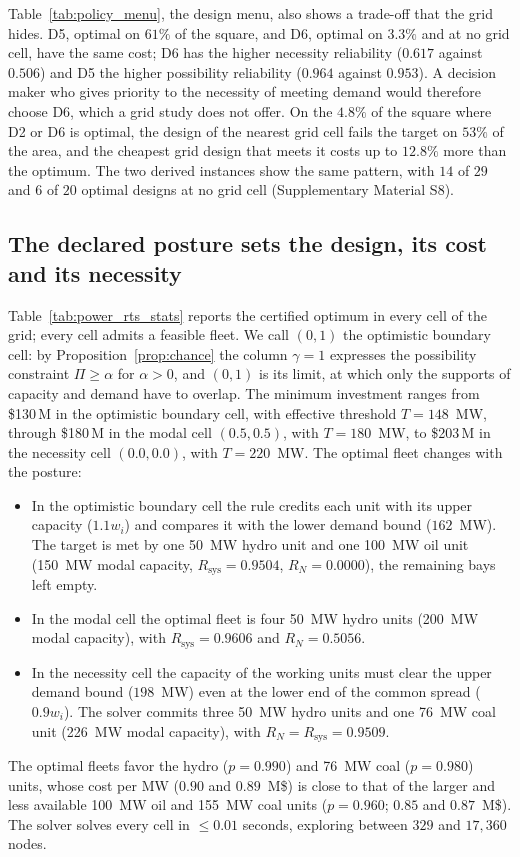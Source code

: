 \documentclass[Review,sagev,times]{sagej}%
\newcommand{\Rsys}{R_{\mathrm{sys}}}\newcommand{\Rtarget}{R_{\mathrm{target}}}
\begin{document}
Table~\ref{tab:policy_menu}, the design menu, also shows a trade-off that the grid hides. D5, optimal on $61\%$
of the square, and D6, optimal on $3.3\%$ and at no grid cell, have the same cost; D6 has the higher necessity
reliability ($0.617$ against $0.506$) and D5 the higher possibility reliability ($0.964$ against $0.953$). A
decision maker who gives priority to the necessity of meeting demand would therefore choose D6, which a grid
study does not offer. On the $4.8\%$ of the square where D2 or D6 is optimal, the design of the nearest grid cell
fails the target on $53\%$ of the area, and the cheapest grid design that meets it costs up to $12.8\%$ more than
the optimum. The two derived instances show the same pattern, with $14$ of $29$ and $6$ of $20$ optimal designs
at no grid cell (Supplementary Material S8).

\subsection{The declared posture sets the design, its cost and its necessity} \label{sec:posture}



Table~\ref{tab:power_rts_stats} reports the certified optimum in every cell of the grid; every cell admits a
feasible fleet. We call $(0,1)$ the optimistic boundary cell: by Proposition~\ref{prop:chance} the column
$\gamma=1$ expresses the possibility constraint $\Pi \ge \alpha$ for $\alpha > 0$, and $(0,1)$ is its limit, at
which only the supports of capacity and demand have to overlap. The minimum investment ranges from \$130\,M in
the optimistic boundary cell, with effective threshold $T = 148$~MW, through \$180\,M in the modal cell
$(0.5, 0.5)$, with $T = 180$~MW, to \$203\,M in the necessity cell $(0.0, 0.0)$, with $T = 220$~MW. The optimal
fleet changes with the posture:
\begin{itemize}
\item In the optimistic boundary cell the rule credits each unit with its upper capacity ($1.1 w_i$) and compares
it with the lower demand bound ($162$~MW). The target is met by one 50~MW hydro unit and one 100~MW oil unit
(150~MW modal capacity, $\Rsys = 0.9504$, $R_N = 0.0000$), the remaining bays left empty.
\item In the modal cell the optimal fleet is four 50~MW hydro units (200~MW modal capacity), with $\Rsys = 0.9606$
and $R_N = 0.5056$.
\item In the necessity cell the capacity of the working units must clear the upper demand bound ($198$~MW) even at
the lower end of the common spread ($0.9 w_i$). The solver commits three 50~MW hydro units and one 76~MW coal
unit (226~MW modal capacity), with $R_N = \Rsys = 0.9509$.
\end{itemize}
The optimal fleets favor the hydro ($p=0.990$) and 76~MW coal ($p=0.980$) units, whose cost per MW ($0.90$ and
$0.89$~M\$) is close to that of the larger and less available 100~MW oil and 155~MW coal units ($p=0.960$; $0.85$
and $0.87$~M\$). The solver solves every cell in $\le 0.01$ seconds, exploring between $329$ and $17{,}360$ nodes.
\end{document}
